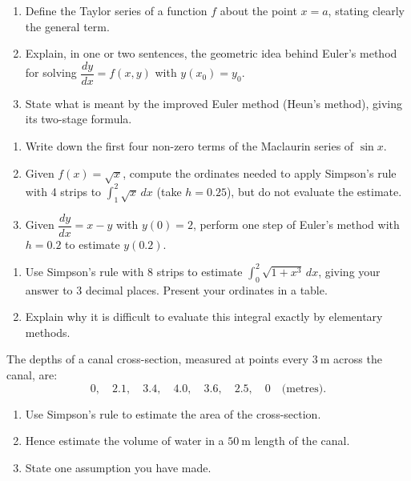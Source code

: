 \documentclass[11pt]{article}
\newcommand{\cle}[1]{{\popxbold\color{popdark}#1}}
\newcounter{popsec}
\newcounter{popsub}
\newcommand{\courssub}[1]{%
  \stepcounter{popsub}%
  \par\vspace{9pt}\noindent{\popxbold\fontsize{11.5}{13}\selectfont\color{popink}{\color{poporange}\thepopsec.\thepopsub}\hspace{6pt}#1}\par\nopagebreak\vspace{4pt}
}
\begin{document}
\begin{exercice}[Definitions]
\begin{enumerate}
\item Define the \cle{Taylor series} of a function $f$ about the point $x = a$, stating clearly the general term.
\item Explain, in one or two sentences, the geometric idea behind \cle{Euler's method} for solving $\dfrac{dy}{dx} = f(x,y)$ with $y(x_0) = y_0$.
\item State what is meant by the \cle{improved Euler method} (Heun's method), giving its two-stage formula.
\end{enumerate}
\end{exercice}

\begin{exercice}
\begin{enumerate}
\item Write down the first four non-zero terms of the Maclaurin series of $\sin x$.
\item Given $f(x) = \sqrt{x}$, compute the ordinates needed to apply Simpson's rule with 4 strips to $\displaystyle\int_1^2 \sqrt{x}\,dx$ (take $h = 0.25$), but do not evaluate the estimate.
\item Given $\dfrac{dy}{dx} = x - y$ with $y(0) = 2$, perform one step of Euler's method with $h = 0.2$ to estimate $y(0.2)$.
\end{enumerate}
\end{exercice}

\courssub{I practise}

\begin{exercice}
\begin{enumerate}
\item Use Simpson's rule with 8 strips to estimate $\displaystyle\int_0^2 \sqrt{1+x^3}\,dx$, giving your answer to 3 decimal places. Present your ordinates in a table.
\item Explain why it is difficult to evaluate this integral exactly by elementary methods.
\end{enumerate}
\end{exercice}

\begin{exercice}
The depths of a canal cross-section, measured at points every $3\ \mathrm{m}$ across the canal, are:
\[ 0,\quad 2.1,\quad 3.4,\quad 4.0,\quad 3.6,\quad 2.5,\quad 0 \quad \text{(metres)}. \]
\begin{enumerate}
\item Use Simpson's rule to estimate the area of the cross-section.
\item Hence estimate the volume of water in a $50\ \mathrm{m}$ length of the canal.
\item State one assumption you have made.
\end{enumerate}
\end{exercice}
\end{document}
